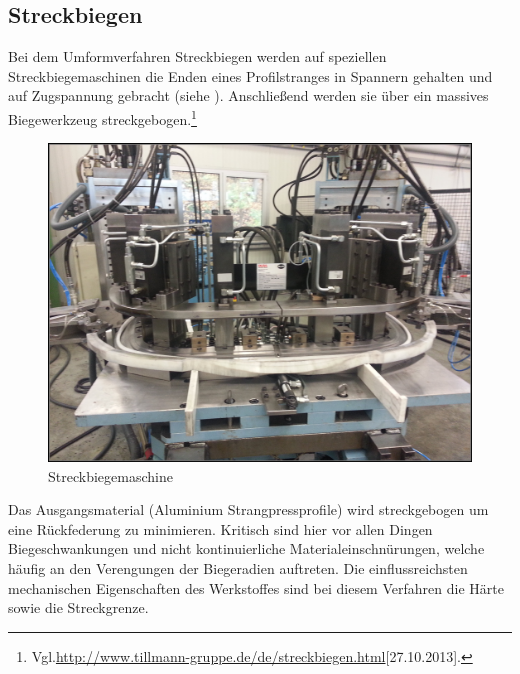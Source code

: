 \documentclass[12pt,a4paper,parskip]{scrartcl}
\begin{document}
	 	 	 	 

\subsection{Streckbiegen}
Bei dem Umformverfahren Streckbiegen werden auf speziellen Streckbiegemaschinen die Enden eines Profilstranges in Spannern gehalten und auf  Zugspannung gebracht (siehe  ). Anschließend werden sie über ein massives Biegewerkzeug streckgebogen.\footnote{Vgl.\url{http://www.tillmann-gruppe.de/de/streckbiegen.html}[27.10.2013].}
\begin{figure}[!htb]
\centering
\includegraphics[scale=.12]{Streckbiegemaschine}
\caption{Streckbiegemaschine}
\label{fig:Streckbiegemaschine}
\end{figure}
Das Ausgangsmaterial (Aluminium Strangpressprofile) wird streckgebogen um eine Rückfederung zu minimieren. Kritisch sind hier vor allen Dingen Biegeschwankungen und nicht kontinuierliche Materialeinschnürungen,  welche häufig an den Verengungen der Biegeradien auftreten. Die einflussreichsten mechanischen Eigenschaften des Werkstoffes sind bei diesem Verfahren die Härte sowie die Streckgrenze.
\end{document}
